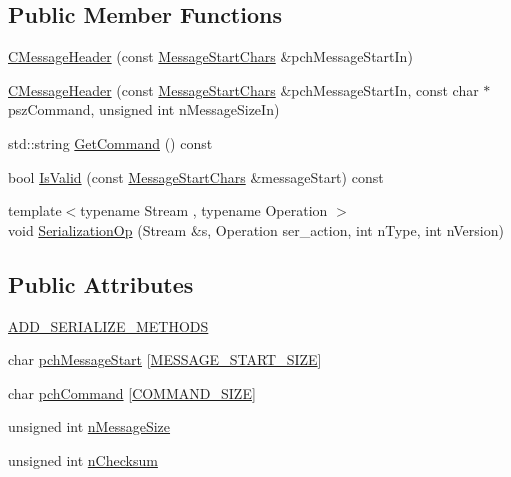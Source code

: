 \subsection*{Public Member Functions}
\begin{DoxyCompactItemize}
\item 
\hyperlink{class_c_message_header_af2b7b2dbd21363099e3da99699d93d59}{C\+Message\+Header} (const \hyperlink{class_c_message_header_a0d0eeb540cbf4087973f6652ad61878f}{Message\+Start\+Chars} \&pch\+Message\+Start\+In)
\item 
\hyperlink{class_c_message_header_a169f178657c1e3621f16adeeae44bc3a}{C\+Message\+Header} (const \hyperlink{class_c_message_header_a0d0eeb540cbf4087973f6652ad61878f}{Message\+Start\+Chars} \&pch\+Message\+Start\+In, const char $\ast$psz\+Command, unsigned int n\+Message\+Size\+In)
\item 
std\+::string \hyperlink{class_c_message_header_a71f022e98bff1acd65be4b75ce4cc038}{Get\+Command} () const 
\item 
bool \hyperlink{class_c_message_header_a80b8c02993fcdeb2d679f74362b3ba14}{Is\+Valid} (const \hyperlink{class_c_message_header_a0d0eeb540cbf4087973f6652ad61878f}{Message\+Start\+Chars} \&message\+Start) const 
\item 
{\footnotesize template$<$typename Stream , typename Operation $>$ }\\void \hyperlink{class_c_message_header_a3881923a93297c3a7a8e413ab3730408}{Serialization\+Op} (Stream \&s, Operation ser\+\_\+action, int n\+Type, int n\+Version)
\end{DoxyCompactItemize}
\subsection*{Public Attributes}
\begin{DoxyCompactItemize}
\item 
\hyperlink{class_c_message_header_a447044c3fbf9d5e98dcc4121ac808d2f}{A\+D\+D\+\_\+\+S\+E\+R\+I\+A\+L\+I\+Z\+E\+\_\+\+M\+E\+T\+H\+O\+D\+S}
\item 
char \hyperlink{class_c_message_header_a4284bf1d2fd792af89e1c93b7e6e274e}{pch\+Message\+Start} \mbox{[}\hyperlink{protocol_8h_a6bcadada595cc3da13e6a04be1715917}{M\+E\+S\+S\+A\+G\+E\+\_\+\+S\+T\+A\+R\+T\+\_\+\+S\+I\+Z\+E}\mbox{]}
\item 
char \hyperlink{class_c_message_header_a87d62b0d9afb3889f318991700a34431}{pch\+Command} \mbox{[}\hyperlink{class_c_message_header_ae63fde66d9aa91c44314b11cdd0dc57aa8c1bfc0fa6a63c8b73abef30555a5e54}{C\+O\+M\+M\+A\+N\+D\+\_\+\+S\+I\+Z\+E}\mbox{]}
\item 
unsigned int \hyperlink{class_c_message_header_a67ccb9f1f23af69e309a8d6c8bfff751}{n\+Message\+Size}
\item 
unsigned int \hyperlink{class_c_message_header_ab9c6bec3694e2c110b4f358af9e55984}{n\+Checksum}
\end{DoxyCompactItemize}


